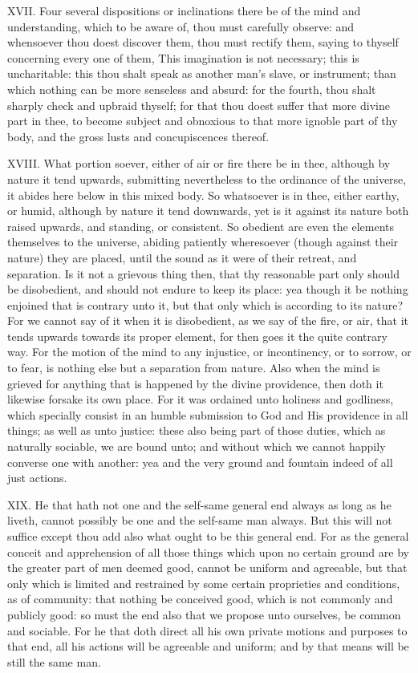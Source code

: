 XVII. Four several dispositions or inclinations there be of the mind and
understanding, which to be aware of, thou must carefully observe: and
whensoever thou doest discover them, thou must rectify them, saying to
thyself concerning every one of them, This imagination is not necessary;
this is uncharitable: this thou shalt speak as another man's slave, or
instrument; than which nothing can be more senseless and absurd: for the
fourth, thou shalt sharply check and upbraid thyself; for that thou doest
suffer that more divine part in thee, to become subject and obnoxious to
that more ignoble part of thy body, and the gross lusts and concupiscences
thereof.

XVIII. What portion soever, either of air or fire there be in thee,
although by nature it tend upwards, submitting nevertheless to the
ordinance of the universe, it abides here below in this mixed body. So
whatsoever is in thee, either earthy, or humid, although by nature it tend
downwards, yet is it against its nature both raised upwards, and standing,
or consistent. So obedient are even the elements themselves to the
universe, abiding patiently wheresoever (though against their nature) they
are placed, until the sound as it were of their retreat, and separation.
Is it not a grievous thing then, that thy reasonable part only should be
disobedient, and should not endure to keep its place: yea though it be
nothing enjoined that is contrary unto it, but that only which is
according to its nature? For we cannot say of it when it is disobedient,
as we say of the fire, or air, that it tends upwards towards its proper
element, for then goes it the quite contrary way. For the motion of the
mind to any injustice, or incontinency, or to sorrow, or to fear, is
nothing else but a separation from nature. Also when the mind is grieved
for anything that is happened by the divine providence, then doth it
likewise forsake its own place. For it was ordained unto holiness and
godliness, which specially consist in an humble submission to God and His
providence in all things; as well as unto justice: these also being part
of those duties, which as naturally sociable, we are bound unto; and
without which we cannot happily converse one with another: yea and the
very ground and fountain indeed of all just actions.

XIX. He that hath not one and the self-same general end always as long
as he liveth, cannot possibly be one and the self-same man always. But
this will not suffice except thou add also what ought to be this general
end. For as the general conceit and apprehension of all those things which
upon no certain ground are by the greater part of men deemed good, cannot
be uniform and agreeable, but that only which is limited and restrained by
some certain proprieties and conditions, as of community: that nothing be
conceived good, which is not commonly and publicly good: so must the end
also that we propose unto ourselves, be common and sociable. For he that
doth direct all his own private motions and purposes to that end, all his
actions will be agreeable and uniform; and by that means will be still the
same man.

